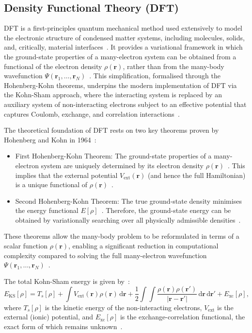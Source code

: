 \subsection*{Density Functional Theory (DFT)}

DFT is a first-principles quantum mechanical method used extensively to model the electronic structure of condensed matter systems, including molecules, solids, and, critically, material interfaces~\cite{Arantes2007-ea, Leung2020-tv, Di_Liberto2022-gz}.
It provides a variational framework in which the ground-state properties of a many-electron system can be obtained from a functional of the electron density $\rho(\mathbf{r})$, rather than from the many-body wavefunction $\Psi(\mathbf{r}_1, \dots, \mathbf{r}_N)$~\nocite{}.
This simplification, formalised through the Hohenberg-Kohn theorems, underpins the modern implementation of DFT via the Kohn-Sham approach, where the interacting system is replaced by an auxiliary system of non-interacting electrons subject to an effective potential that captures Coulomb, exchange, and correlation interactions~\cite{Leung2020-tv}.

\newpage The theoretical foundation of DFT rests on two key theorems proven by Hohenberg and Kohn in 1964~\cite{Hohenberg1964-yh}:
\begin{itemize}
    \item First Hohenberg-Kohn Theorem: The ground-state properties of a many-electron system are uniquely determined by its electron density $\rho(\mathbf{r})$~\nocite{}.
    This implies that the external potential $V_{\mathrm{ext}}(\mathbf{r})$ (and hence the full Hamiltonian) is a unique functional of $\rho(\mathbf{r})$~\nocite{}.
    \item Second Hohenberg-Kohn Theorem: The true ground-state density minimises the energy functional $E[\rho]$~\nocite{}.
    Therefore, the ground-state energy can be obtained by variationally searching over all physically admissible densities~\nocite{}.
\end{itemize}
These theorems allow the many-body problem to be reformulated in terms of a scalar function $\rho(\mathbf{r})$, enabling a significant reduction in computational complexity compared to solving the full many-electron wavefunction $\Psi(\mathbf{r}_1, \dots, \mathbf{r}_N)$~\nocite{}.

The total Kohn-Sham energy is given by~\nocite{}:
\begin{equation}
    E_{\mathrm{KS}}[\rho] = T_s[\rho] + \int V_{\mathrm{ext}}(\mathbf{r}) \rho(\mathbf{r}) \, \mathrm{d}\mathbf{r} + \frac{1}{2} \int \int \frac{\rho(\mathbf{r}) \rho(\mathbf{r'})}{|\mathbf{r} - \mathbf{r'}|} \, \mathrm{d}\mathbf{r} \, \mathrm{d}\mathbf{r'} + E_{\mathrm{xc}}[\rho],
\end{equation}
where $T_s[\rho]$ is the kinetic energy of the non-interacting electrons, $V_{\mathrm{ext}}$ is the external (ionic) potential, and $E_{\mathrm{xc}}[\rho]$ is the exchange-correlation functional, the exact form of which remains unknown~\nocite{}.

